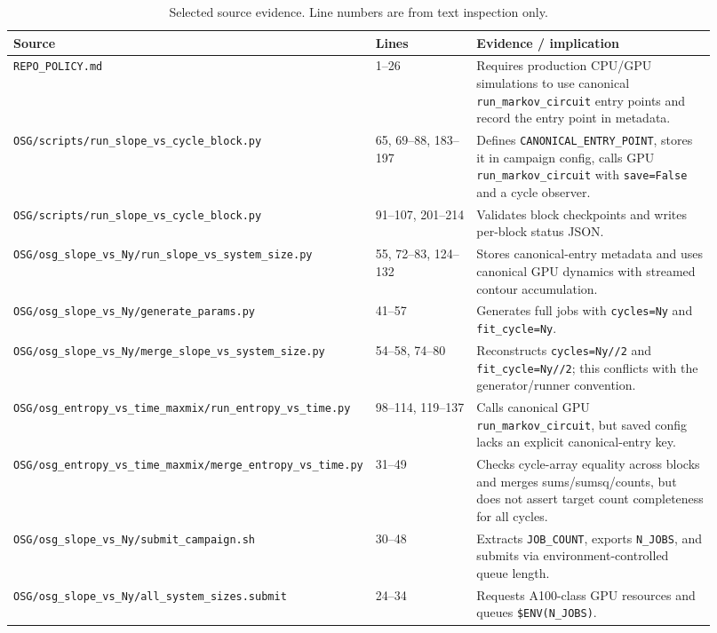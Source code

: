 \documentclass[aps,prb,onecolumn,nofootinbib,superscriptaddress]{revtex4-2}
\begin{document}
\begin{table}[h]
\caption{Selected source evidence.  Line numbers are from text inspection only.}
\begin{ruledtabular}
\begin{tabular}{p{0.34\linewidth}p{0.18\linewidth}p{0.40\linewidth}}
Source & Lines & Evidence / implication \\
\hline
\texttt{REPO\_POLICY.md} & 1--26 & Requires production CPU/GPU simulations to use canonical \texttt{run\_markov\_circuit} entry points and record the entry point in metadata. \\
\texttt{OSG/scripts/run\_slope\_vs\_cycle\_block.py} & 65, 69--88, 183--197 & Defines \texttt{CANONICAL\_ENTRY\_POINT}, stores it in campaign config, calls GPU \texttt{run\_markov\_circuit} with \texttt{save=False} and a cycle observer. \\
\texttt{OSG/scripts/run\_slope\_vs\_cycle\_block.py} & 91--107, 201--214 & Validates block checkpoints and writes per-block status JSON. \\
\texttt{OSG/osg\_slope\_vs\_Ny/run\_slope\_vs\_system\_size.py} & 55, 72--83, 124--132 & Stores canonical-entry metadata and uses canonical GPU dynamics with streamed contour accumulation. \\
\texttt{OSG/osg\_slope\_vs\_Ny/generate\_params.py} & 41--57 & Generates full jobs with \texttt{cycles=Ny} and \texttt{fit\_cycle=Ny}. \\
\texttt{OSG/osg\_slope\_vs\_Ny/merge\_slope\_vs\_system\_size.py} & 54--58, 74--80 & Reconstructs \texttt{cycles=Ny//2} and \texttt{fit\_cycle=Ny//2}; this conflicts with the generator/runner convention. \\
\texttt{OSG/osg\_entropy\_vs\_time\_maxmix/run\_entropy\_vs\_time.py} & 98--114, 119--137 & Calls canonical GPU \texttt{run\_markov\_circuit}, but saved config lacks an explicit canonical-entry key. \\
\texttt{OSG/osg\_entropy\_vs\_time\_maxmix/merge\_entropy\_vs\_time.py} & 31--49 & Checks cycle-array equality across blocks and merges sums/sumsq/counts, but does not assert target count completeness for all cycles. \\
\texttt{OSG/osg\_slope\_vs\_Ny/submit\_campaign.sh} & 30--48 & Extracts \texttt{JOB\_COUNT}, exports \texttt{N\_JOBS}, and submits via environment-controlled queue length. \\
\texttt{OSG/osg\_slope\_vs\_Ny/all\_system\_sizes.submit} & 24--34 & Requests A100-class GPU resources and queues \texttt{\$ENV(N\_JOBS)}. \\

\end{tabular}
\end{ruledtabular}
\end{table}
\end{document}
